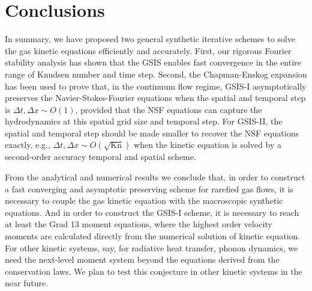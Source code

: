 \documentclass[onefignum,onetabnum]{siamart171218}
\newcommand{\lei}[1]{{\leavevmode\color{blue}#1}}
\begin{document}



\section{Conclusions}\label{section_summary}

In summary, we have proposed two general synthetic iterative schemes to solve the gas kinetic equations efficiently and accurately. First, our rigorous Fourier stability analysis has shown that the GSIS enables fast convergence in the entire range of Knudsen number and time step. Second, the Chapman-Enskog expansion has been used to prove that, in the continuum flow regime, GSIS-I asymptotically preserves the Navier-Stokes-Fourier equations when the spatial and temporal step is $\Delta{t}, \Delta{x}\sim{O(1)}$, provided that the NSF equations can capture the hydrodynamics at this spatial grid size and temporal step. For GSIS-II, the spatial and temporal step should be made smaller to recover the NSF equations exactly, e.g., $\Delta{t}, \Delta{x}\sim{O(\sqrt{\text{Kn}})}$ when the kinetic equation is solved by a second-order accuracy temporal and spatial scheme.



From the analytical and numerical results we conclude that, in order to construct a fast converging and asymptotic preserving scheme for rarefied gas flows, it is necessary to couple the gas kinetic equation with the macroscopic synthetic equations. And in order to construct the GSIS-I scheme, it is necessary to reach at least the Grad 13 moment equations, where the highest order velocity moments are calculated directly from the numerical solution of kinetic equation. For other kinetic systems, say, for radiative heat transfer, phonon dynamics, we need the next-level moment system beyond the equations derived from the conservation laws. We plan to test this conjecture in other kinetic systems in the near future.





%


%




\end{document}
